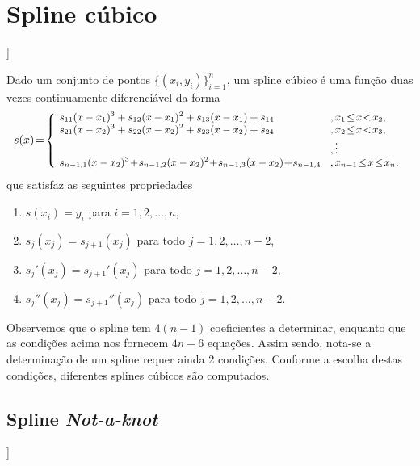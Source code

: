 \section{Spline cúbico}\label{cap_interp_splines}

\begin{flushleft}
  [[tag:revisar]]
\end{flushleft}

Dado um conjunto de pontos $\{(x_i,y_i)\}_{i=1}^n$, um spline cúbico é uma função duas vezes continuamente diferenciável da forma
\begin{equation}
  \begin{small}
    s(x)\!=\!\left\{
      \begin{array}{ll}
        \!s_{11}(x-x_1)^3 + s_{12}(x-x_1)^2 + s_{13}(x-x_1) + s_{14} &,x_1\!\leq\!x\!<\!x_2,\\
        \!s_{21}(x-x_2)^3 + s_{22}(x-x_2)^2 + s_{23}(x-x_2) + s_{24} &,x_2\!\leq\!x\!<\!x_3,\\
                                                                   &, \vdots \\
        \!s_{n-1,1}(x-x_2)^3\!+\!s_{n-1,2}(x-x_2)^2\!+\!s_{n-1,3}(x-x_2)\!+\!s_{n-1,4}\!&,x_{n-1}\!\leq\!x\!\leq\!x_n.
      \end{array}
    \right.
  \end{small}
\end{equation}
que satisfaz as seguintes propriedades
\begin{enumerate}
\item $s(x_i) = y_i$ para $i=1, 2, \dotsc, n$,
\item $s_j(x_j) = s_{j+1}(x_j)$ para todo $j=1,2,\dotsc,n-2$,
\item $s_j'(x_j) = s_{j+1}'(x_j)$ para todo $j=1,2,\dotsc,n-2$,  
\item $s_j''(x_j) = s_{j+1}''(x_j)$ para todo $j=1,2,\dotsc,n-2$.
\end{enumerate}

Observemos que o spline tem $4(n-1)$ coeficientes a determinar, enquanto que as condições acima nos fornecem $4n-6$ equações. Assim sendo, nota-se a determinação de um spline requer ainda 2 condições. Conforme a escolha destas condições, diferentes splines cúbicos são computados.

\subsection{Spline {\it Not-a-knot}}

\begin{flushleft}
  [[tag:revisar]]
\end{flushleft}

